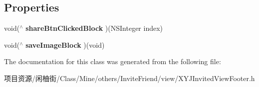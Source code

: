 \subsection*{Properties}
\begin{DoxyCompactItemize}
\item 
\mbox{\label{interface_x_y_j_invited_view_footer_a3eeb3053818bb7b006ae22cec1aeb573}} 
void($^\wedge$ {\bfseries share\+Btn\+Clicked\+Block} )(N\+S\+Integer index)
\item 
\mbox{\label{interface_x_y_j_invited_view_footer_a8220dd45e7b92477797078e2632dabaa}} 
void($^\wedge$ {\bfseries save\+Image\+Block} )(void)
\end{DoxyCompactItemize}


The documentation for this class was generated from the following file\+:\begin{DoxyCompactItemize}
\item 
项目资源/闲柚街/\+Class/\+Mine/others/\+Invite\+Friend/view/X\+Y\+J\+Invited\+View\+Footer.\+h\end{DoxyCompactItemize}
